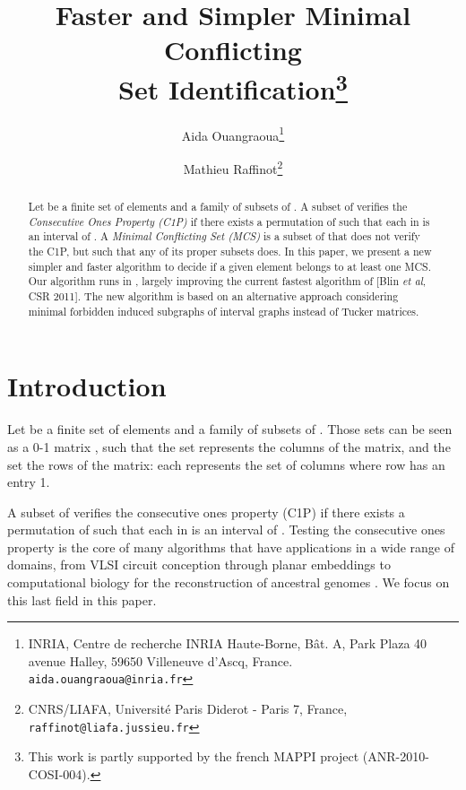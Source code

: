 \documentclass{article}
\begin{document}
\title{\vspace*{-2cm}Faster and Simpler Minimal Conflicting\\ Set
  Identification\thanks{This work is partly supported by the french MAPPI project
    (ANR-2010-COSI-004).}}

\author{Aida Ouangraoua\thanks{INRIA, Centre de recherche INRIA
    Haute-Borne, Bât. A, Park Plaza 40 avenue Halley, 59650 Villeneuve
    d'Ascq, France.  {\tt aida.ouangraoua@inria.fr}} \and Mathieu
  Raffinot\thanks{CNRS/LIAFA, Universit\'e Paris Diderot - Paris 7,
    France, {\tt raffinot@liafa.jussieu.fr}} 
}

\maketitle


\begin{abstract}
Let  be a finite set of  elements and  a family of  subsets of . A subset  of  verifies the \emph{Consecutive Ones
Property (C1P)} if there exists a permutation  of  such
that each  in  is an interval of . A \emph{Minimal
Conflicting Set (MCS)}  is a subset of
  that does not verify the C1P, but such that any of its proper 
subsets does. In this paper, we present a new simpler and faster algorithm 
to decide if a given element  belongs to at least one MCS. 
Our algorithm runs in , largely improving
the current  fastest algorithm of
[Blin {\em et al}, CSR 2011]. The new algorithm is based on an alternative
approach considering minimal forbidden induced subgraphs of interval
graphs instead of Tucker matrices.
\end{abstract}  


\section{Introduction}

Let  be a finite set of  elements
and  a family of  subsets of
. Those sets can be seen as a  0-1 matrix
, such that the set  represents the 
columns of the matrix, and the set  the rows of the matrix:
each  represents the set of columns where row  has
an entry 1.









A subset  of  verifies the consecutive ones
property (C1P) if there exists a permutation  of  such
that each  in  is an interval of . Testing the
consecutive ones property is the core of many algorithms that have
applications in a wide range of domains, from VLSI circuit conception
through planar embeddings \cite{nr-pgd-04} to computational biology
for the reconstruction of ancestral genomes
\cite{BBCC2004,Stephane2010,CHSY2009,Chauve08,SW2009}. 
We focus on this last field in this paper.
\end{document}
